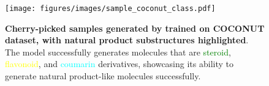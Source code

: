 \begin{figure}[h!]
    \centering
    \texttt{[image: figures/images/sample\_coconut\_class.pdf]}
    \caption{\textbf{Cherry-picked samples generated by \methodname{} trained on COCONUT dataset, with natural product substructures highlighted}. 
    The model successfully generates molecules that are \textcolor{green}{steroid}, \textcolor{yellow}{flavonoid}, and \textcolor{cyan}{coumarin} derivatives, showcasing its ability to generate natural product-like molecules successfully.}
    \label{fig:sample_coconut_class}
\end{figure}